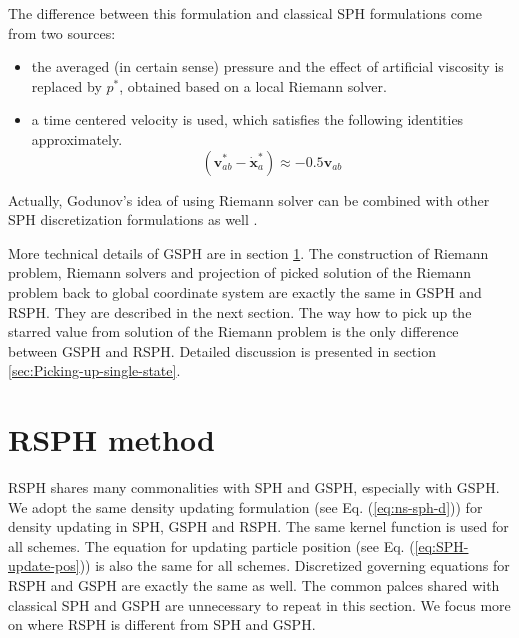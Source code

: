 The difference between this formulation and classical SPH formulations come from two sources: 
\begin{itemize}
\item the averaged (in certain sense) pressure and the effect of artificial viscosity is replaced by  $p^{\ast}$, obtained based on a local Riemann solver.
\item a time centered velocity is used, which satisfies the following identities approximately. 
\begin{equation}
\left( \textbf{v}_{a b}^{\ast} - \dot{\textbf{x}}_{a}^{\ast} \right) \approx -0.5 \textbf{v}_{a b}
\label{eq:SPH-GSPH-difference2}
\end{equation}
\end{itemize}
Actually, Godunov's idea of using Riemann solver can be combined with other SPH discretization formulations as well \citep{cha2003implementations}. 

More technical details of GSPH are in section \ref{sec:RSPH-method}. The construction of Riemann problem, Riemann solvers and projection of picked solution of the Riemann problem back to global coordinate system are exactly the same in GSPH and RSPH. They are described in the next section. The way how to pick up the starred value from solution of the Riemann problem is the only difference between GSPH and RSPH. Detailed discussion is presented in section \ref{sec:Picking-up-single-state}. 

\section{RSPH method} \label{sec:RSPH-method}
RSPH shares many commonalities with SPH and GSPH, especially with GSPH. We adopt the same density updating formulation (see Eq. (\ref{eq:ns-sph-d})) for density updating in SPH, GSPH and RSPH. The same kernel function is used for all schemes. The equation for updating particle position (see Eq. (\ref{eq:SPH-update-pos})) is also the same for all schemes. Discretized governing equations for RSPH and GSPH are exactly the same as well. The common palces shared with classical SPH and GSPH are unnecessary to repeat in this section. We focus more on where RSPH is different from SPH and GSPH.

